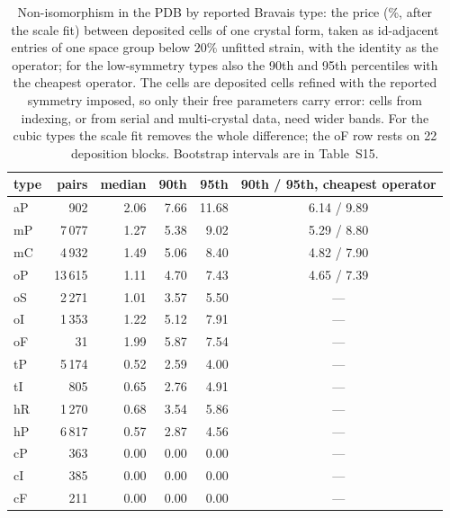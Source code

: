 \begin{table}
\caption{Non-isomorphism in the PDB by reported Bravais type: the price (\%, after the scale fit) between deposited cells of one crystal form, taken as id-adjacent entries of one space group below $20\%$ unfitted strain, with the identity as the operator; for the low-symmetry types also the 90th and 95th percentiles with the cheapest operator. The cells are deposited cells refined with the reported symmetry imposed, so only their free parameters carry error: cells from indexing, or from serial and multi-crystal data, need wider bands. For the cubic types the scale fit removes the whole difference; the oF row rests on 22 deposition blocks. Bootstrap intervals are in Table~S15.}
\label{tab:noniso}
\begin{footnotesize}
\begin{tabular}{lrrrrc}
\toprule
type & pairs & median & 90th & 95th & 90th / 95th, cheapest operator \\
\midrule
aP & 902 & 2.06 & 7.66 & 11.68 & 6.14 / 9.89 \\
mP & 7\,077 & 1.27 & 5.38 & 9.02 & 5.29 / 8.80 \\
mC & 4\,932 & 1.49 & 5.06 & 8.40 & 4.82 / 7.90 \\
oP & 13\,615 & 1.11 & 4.70 & 7.43 & 4.65 / 7.39 \\
oS & 2\,271 & 1.01 & 3.57 & 5.50 & --- \\
oI & 1\,353 & 1.22 & 5.12 & 7.91 & --- \\
oF & 31 & 1.99 & 5.87 & 7.54 & --- \\
tP & 5\,174 & 0.52 & 2.59 & 4.00 & --- \\
tI & 805 & 0.65 & 2.76 & 4.91 & --- \\
hR & 1\,270 & 0.68 & 3.54 & 5.86 & --- \\
hP & 6\,817 & 0.57 & 2.87 & 4.56 & --- \\
cP & 363 & 0.00 & 0.00 & 0.00 & --- \\
cI & 385 & 0.00 & 0.00 & 0.00 & --- \\
cF & 211 & 0.00 & 0.00 & 0.00 & --- \\
\bottomrule
\end{tabular}
\end{footnotesize}
\end{table}

